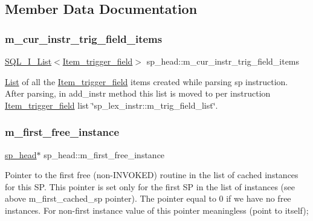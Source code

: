 \subsection{Member Data Documentation}
\mbox{\label{classsp__head_aff67bb1a63eae95edb8b96677229b537}} 
\subsubsection{\texorpdfstring{m\+\_\+cur\+\_\+instr\+\_\+trig\+\_\+field\+\_\+items}{m\_cur\_instr\_trig\_field\_items}}
{\footnotesize\ttfamily \mbox{\hyperlink{classSQL__I__List}{S\+Q\+L\+\_\+\+I\+\_\+\+List}}$<$\mbox{\hyperlink{classItem__trigger__field}{Item\+\_\+trigger\+\_\+field}}$>$ sp\+\_\+head\+::m\+\_\+cur\+\_\+instr\+\_\+trig\+\_\+field\+\_\+items}

\mbox{\hyperlink{classList}{List}} of all the \mbox{\hyperlink{classItem__trigger__field}{Item\+\_\+trigger\+\_\+field}} items created while parsing sp instruction. After parsing, in add\+\_\+instr method this list is moved to per instruction \mbox{\hyperlink{classItem__trigger__field}{Item\+\_\+trigger\+\_\+field}} list \char`\"{}sp\+\_\+lex\+\_\+instr\+::m\+\_\+trig\+\_\+field\+\_\+list\char`\"{}. \mbox{\label{classsp__head_ad340ae0be6cb8ce662082c48cfc03d27}} 
\subsubsection{\texorpdfstring{m\+\_\+first\+\_\+free\+\_\+instance}{m\_first\_free\_instance}}
{\footnotesize\ttfamily \mbox{\hyperlink{classsp__head}{sp\+\_\+head}}$\ast$ sp\+\_\+head\+::m\+\_\+first\+\_\+free\+\_\+instance}

Pointer to the first free (non-\/I\+N\+V\+O\+K\+ED) routine in the list of cached instances for this SP. This pointer is set only for the first SP in the list of instances (see above m\+\_\+first\+\_\+cached\+\_\+sp pointer). The pointer equal to 0 if we have no free instances. For non-\/first instance value of this pointer meaningless (point to itself); \mbox{\label{classsp__head_ae0c36bbb7794aab5f12f10bb29f3e31f}} 
